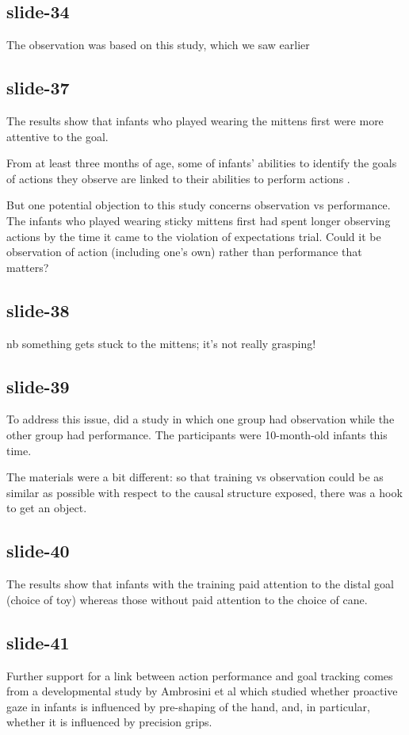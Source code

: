 \documentclass[12pt,\papersize]{extarticle}
\begin{document}
\subsection{slide-34}
The observation was based on this study, which we saw earlier
 
\subsection{slide-37}
The results show that infants who played wearing the mittens first
were more attentive to the goal.
 
From at least three months of age, some of infants’ abilities to identify
the goals of actions they observe are linked to their abilities to perform
actions \citep{woodward:2009_infants}.
 
But one potential objection to this study concerns observation vs performance.
The infants who played wearing sticky mittens first had spent longer observing
actions by the time it came to the violation of expectations trial.
Could it be observation of action (including one’s own) rather than performance
that matters?
 
\subsection{slide-38}
nb something gets stuck to the mittens; it's not really grasping!
 
\subsection{slide-39}
To address this issue, \citet{sommerville:2008_experience} did a study in 
which one group had observation while the other group had performance.
The participants were 10-month-old infants this time.
 
The materials were a bit different: so that training vs observation could 
be as similar as possible with respect to the causal structure exposed,
there was a hook to get an object.
 
\subsection{slide-40}
The results show that infants with the training paid attention to the
distal goal (choice of toy) whereas those without paid attention to the
choice of cane.
 
\subsection{slide-41}
Further support for a link between action performance and goal tracking
comes from a developmental study by Ambrosini et al which studied whether proactive
gaze in infants is influenced by pre-shaping of the hand, and, in particular, 
whether it is influenced by precision grips.
 
\end{document}
